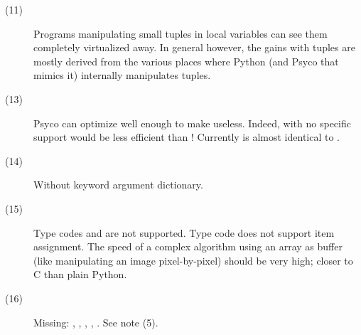 \documentclass{manual}
\begin{document}
\begin{description}
\item[(11)]
  Programs manipulating small tuples in local variables can see them completely virtualized away.  In general however, the gains with tuples are mostly derived from the various places where Python (and Psyco that mimics it) internally manipulates tuples.

\item[(13)]
  Psyco can optimize  well enough to make  useless.  Indeed, with no specific support  would be less efficient than ! Currently  is almost identical to .
  
\item[(14)]
  Without keyword argument dictionary.
  
\item[(15)]
  Type codes  and  are not supported.  Type code  does not support item assignment.  The speed of a complex algorithm using an array as buffer (like manipulating an image pixel-by-pixel) should be very high; closer to C than plain Python.

\item[(16)]
  Missing: , , , , .  See note (5).
  
\end{description}


\end{document}
